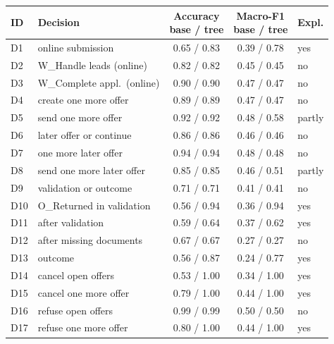 \begin{tabular}{@{}llccl@{}}
\toprule
ID & Decision & \makecell{Accuracy\\base / tree} & \makecell{Macro-F1\\base / tree} & Expl. \\
\midrule
D1 & online submission & 0.65 / 0.83 & 0.39 / 0.78 & yes \\
D2 & W\_Handle leads (online) & 0.82 / 0.82 & 0.45 / 0.45 & no \\
D3 & W\_Complete appl.\ (online) & 0.90 / 0.90 & 0.47 / 0.47 & no \\
D4 & create one more offer & 0.89 / 0.89 & 0.47 / 0.47 & no \\
D5 & send one more offer & 0.92 / 0.92 & 0.48 / 0.58 & partly \\
D6 & later offer or continue & 0.86 / 0.86 & 0.46 / 0.46 & no \\
D7 & one more later offer & 0.94 / 0.94 & 0.48 / 0.48 & no \\
D8 & send one more later offer & 0.85 / 0.85 & 0.46 / 0.51 & partly \\
D9 & validation or outcome & 0.71 / 0.71 & 0.41 / 0.41 & no \\
D10 & O\_Returned in validation & 0.56 / 0.94 & 0.36 / 0.94 & yes \\
D11 & after validation & 0.59 / 0.64 & 0.37 / 0.62 & yes \\
D12 & after missing documents & 0.67 / 0.67 & 0.27 / 0.27 & no \\
D13 & outcome & 0.56 / 0.87 & 0.24 / 0.77 & yes \\
D14 & cancel open offers & 0.53 / 1.00 & 0.34 / 1.00 & yes \\
D15 & cancel one more offer & 0.79 / 1.00 & 0.44 / 1.00 & yes \\
D16 & refuse open offers & 0.99 / 0.99 & 0.50 / 0.50 & no \\
D17 & refuse one more offer & 0.80 / 1.00 & 0.44 / 1.00 & yes \\
\bottomrule
\end{tabular}
